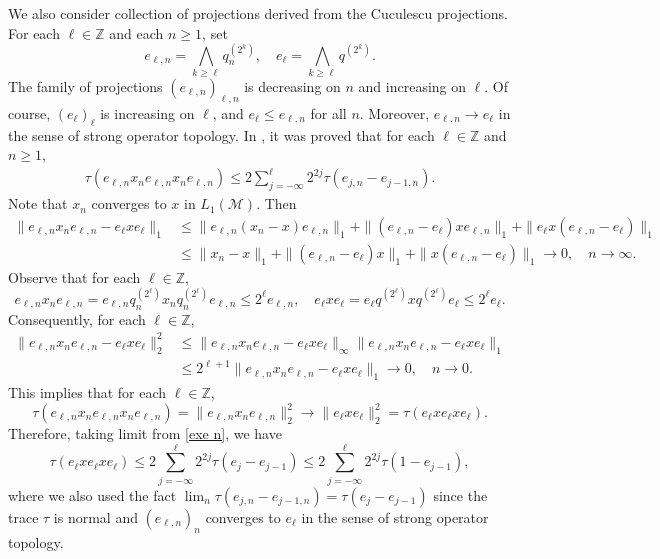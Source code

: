 \documentclass[11]{amsart}
\numberwithin{equation}{section}
\begin{document}
We also consider collection of projections derived from the Cuculescu
projections. For each $\ell\in\mathbb{Z}$ and each $n\geq1$, set 
\begin{equation}\label{eq pro e}
e_{\ell,n}=\bigwedge_{k\geq \ell}q_{n}^{(2^{k})}, \quad e_{\ell}=\bigwedge_{k\geq \ell}q^{(2^k)}.
\end{equation}
The family of projections $(e_{\ell,n})_{\ell,n}$ is decreasing on $n$ and increasing on $\ell$. Of course,  $(e_{\ell})_{\ell}$ is increasing on $\ell$, and $e_{\ell}\leq e_{\ell,n}$ for all $n$. Moreover, $e_{\ell,n}\to e_{\ell}$ in the sense of strong operator topology. 
In \cite[eq. (2.5)]{JRWZ2020}, it was proved that for each $\ell\in\mathbb{Z}$ and $n\geq1$, 
\begin{align}\label{exe n}
	\tau(e_{\ell,n}x_ne_{\ell,n}x_ne_{\ell,n})\leq 2\sum_{j=-\infty}^{\ell} 2^{2j}\tau(e_{j,n}-e_{j-1,n}).
\end{align}	
Note that $x_n$ converges to $x$ in $L_1(\mathcal{M})$. Then
\begin{align*}
	\|e_{\ell,n}x_ne_{\ell,n}-e_{\ell}xe_{\ell}\|_1&\leq \|e_{\ell,n}(x_n-x)e_{\ell,n}\|_1+\|(e_{\ell,n}-e_{\ell})xe_{\ell,n}\|_1+\|e_{\ell}x(e_{\ell,n}-e_{\ell})\|_1\\
	&\leq \|x_n-x\|_1
	+\|(e_{\ell,n}-e_{\ell})x\|_1
	+\|x(e_{\ell,n}-e_{\ell})\|_1\longrightarrow0,\quad  n\to \infty.
\end{align*}
Observe that for each $\ell\in\mathbb{Z}$,
$$e_{\ell,n}x_ne_{\ell,n}=e_{\ell,n}q_n^{(2^{\ell})}x_nq_n^{(2^{\ell})}e_{\ell,n}\leq 2^{\ell}e_{\ell,n},\quad e_{\ell}xe_{\ell}=e_{\ell}q^{(2^{\ell})}xq^{(2^{\ell})}e_{\ell}\leq 2^{\ell}e_{\ell}.$$
Consequently, for each $\ell\in\mathbb{Z}$,
\begin{align*}
	\|e_{\ell,n}x_ne_{\ell,n}-e_{\ell}xe_{\ell}\|_2^2&\leq \|e_{\ell,n}x_ne_{\ell,n}-e_{\ell}xe_{\ell}\|_{\infty}\|e_{\ell,n}x_ne_{\ell,n}-e_{\ell}xe_{\ell}\|_1\\
	&\leq 2^{\ell+1}	\|e_{\ell,n}x_ne_{\ell,n}-e_{\ell}xe_{\ell}\|_1 \longrightarrow 0,\quad n\to 0.
\end{align*}
This implies that for each $\ell\in\mathbb{Z}$,
$$	\tau(e_{\ell,n}x_ne_{\ell,n}x_ne_{\ell,n})=\|e_{\ell,n}x_ne_{\ell,n}\|_2^2\to \|e_{\ell}xe_{\ell}\|_2^2=	\tau(e_{\ell}xe_{\ell}xe_{\ell}).$$
Therefore, taking limit from \eqref{exe n}, we have
\begin{equation}\label{eq exe}
	\tau(e_{\ell}xe_{\ell}xe_{\ell})\leq 2\sum_{j=-\infty}^{\ell} 2^{2j}\tau(e_{j}-e_{j-1})\leq 2\sum_{j=-\infty}^{\ell} 2^{2j}\tau(1-e_{j-1}),
\end{equation}	
where we also used the fact  $\lim_n\tau(e_{j,n}-e_{j-1,n})=\tau(e_{j}-e_{j-1})$ since the trace $\tau$ is normal and $(e_{\ell,n})_n$ converges to $e_{\ell}$ in the sense of strong operator topology.
\end{document}
